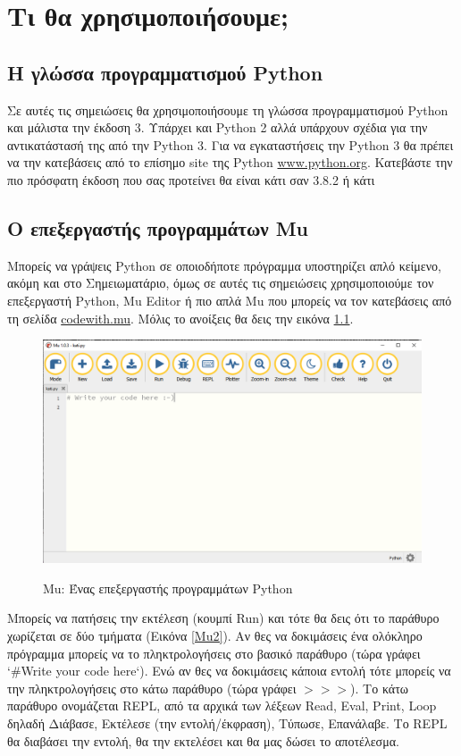 \chapter{Τι θα χρησιμοποιήσουμε;}
\section{Η γλώσσα προγραμματισμού Python}
Σε αυτές τις σημειώσεις θα χρησιμοποιήσουμε τη γλώσσα προγραμματισμού Python και μάλιστα την έκδοση 3. Υπάρχει και Python 2 αλλά υπάρχουν σχέδια για την αντικατάστασή της από την Python 3. Για να εγκαταστήσεις την Python 3 θα πρέπει να την κατεβάσεις από το επίσημο site της Python \href{https://www.python.org/}{www.python.org}. Κατεβάστε την πιο πρόσφατη έκδοση που σας προτείνει θα είναι κάτι σαν 3.8.2 ή κάτι 

\section{Ο επεξεργαστής προγραμμάτων Mu}
Μπορείς να γράψεις Python σε οποιοδήποτε πρόγραμμα υποστηρίζει απλό κείμενο, ακόμη και στο Σημειωματάριο, όμως σε αυτές τις σημειώσεις χρησιμοποιούμε τον επεξεργαστή Python, Mu Editor ή πιο απλά Mu που μπορείς να τον κατεβάσεις από τη σελίδα \href{https://codewith.mu/}{codewith.mu}. Μόλις το ανοίξεις θα δεις την εικόνα \ref{Mu}. 
\begin{figure}
\includegraphics[width=\textwidth]{mu.png}
\label{Mu}
\caption{Mu: Ένας επεξεργαστής προγραμμάτων Python}
\end{figure}

Μπορείς να πατήσεις την εκτέλεση (κουμπί Run) και τότε θα δεις ότι το παράθυρο χωρίζεται σε δύο τμήματα (Εικόνα \ref{Mu2}).  Αν θες να δοκιμάσεις ένα ολόκληρο πρόγραμμα μπορείς να το πληκτρολογήσεις στο βασικό παράθυρο (τώρα γράφει `\#Write your code here`). Ενώ αν θες να δοκιμάσεις κάποια εντολή τότε μπορείς να την πληκτρολογήσεις στο κάτω παράθυρο (τώρα γράφει $>>>$).  Το κάτω παράθυρο ονομάζεται REPL, από τα αρχικά των λέξεων Read, Eval, Print, Loop δηλαδή Διάβασε, Εκτέλεσε (την εντολή/έκφραση), Τύπωσε, Επανάλαβε. Το REPL θα διαβάσει την εντολή, θα την εκτελέσει και θα μας δώσει το αποτέλεσμα.

